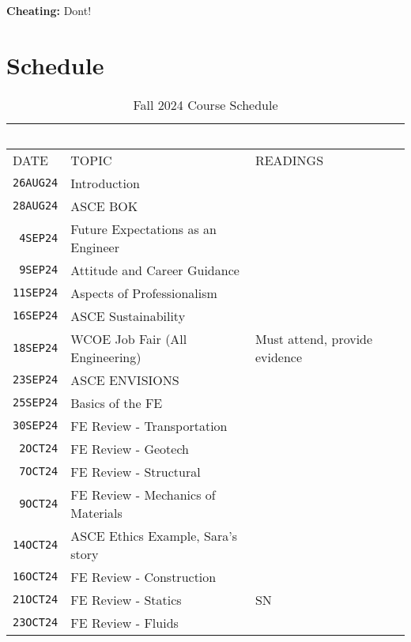 \documentclass[12pt]{article}
\begin{document}
\textbf{Cheating:} Dont!


\clearpage
\section*{Schedule}
\begin{table}[ht!]
   \centering
   \caption{Fall 2024 Course Schedule}
   \begin{tabular}{p{0.5in}p{3.0in}p{3.0in}} 
   ~ & ~ & ~  \\
\hline
DATE & TOPIC & READINGS  \\
\hline
\texttt{26AUG24} & Introduction &   \\ %
\texttt{28AUG24} & ASCE BOK &  \\ %
\texttt{~4SEP24} & Future Expectations as an Engineer & \\ %
\texttt{~9SEP24} & Attitude and Career Guidance &  \\ %
\texttt{11SEP24} & Aspects of Professionalism   &  \\ %
\texttt{16SEP24} & ASCE Sustainability & \\ %
\texttt{18SEP24} & WCOE Job Fair (All Engineering)   & Must attend, provide evidence\\ %
\texttt{23SEP24} & ASCE ENVISIONS &  \\ %
\texttt{25SEP24} & Basics of the FE &   \\  %
\texttt{30SEP24} & FE Review - Transportation &  \\ %
\texttt{~2OCT24} & FE Review - Geotech & \\ %
\texttt{~7OCT24} & FE Review - Structural & \\ %
\texttt{~9OCT24} & FE Review - Mechanics of Materials &  \\  %
\texttt{14OCT24} & ASCE Ethics Example, Sara's story  & \\ %
\texttt{16OCT24} & FE Review - Construction &  \\ %
\texttt{21OCT24} & FE Review - Statics  & SN \\ %
\texttt{23OCT24} & FE Review - Fluids & \\ %

\end{tabular}
\end{table}
\end{document}

